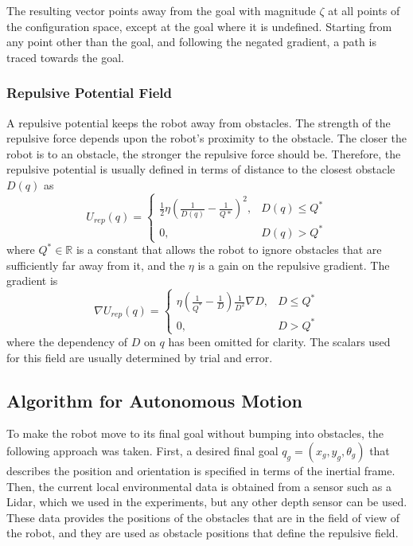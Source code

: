 \documentclass[conference]{IEEEtran}
\begin{document}
The resulting vector points away from the goal with magnitude $\zeta$ at all
points of the configuration space, except at the goal where it is
undefined. Starting from any point other than the goal, and following the
negated gradient, a path is traced towards the goal.

\subsubsection{Repulsive Potential Field}

A repulsive potential keeps the robot away from obstacles. The strength of the
repulsive force depends upon the robot's proximity to the obstacle. The closer
the robot is to an obstacle, the stronger the repulsive force should
be. Therefore, the repulsive potential is usually defined in terms of distance
to the closest obstacle $D(q)$ as 
\begin{equation}
  U_{rep}(q) = 
  \begin{cases}
    \frac{1}{2}\eta(\frac{1}{D(q)} - \frac{1}{Q*})^2, & D(q)\leq Q^* \\
    0, & D(q) > Q^*
  \end{cases}
  \label{eq:pot_rep}
\end{equation}
where $Q^* \in \mathbb R$ is a constant that allows the robot to ignore
obstacles that are sufficiently far away from it, and the $\eta$ is a gain on
the repulsive gradient. The gradient is
\begin{equation}
  \nabla U_{rep}(q) = 
  \begin{cases}
    \eta (\frac{1}{Q^*} - \frac{1}{D})\frac{1}{D^2} \nabla D, &D \leq Q^*\\
    0 , &D > Q^*
  \end{cases}
  \label{eq:force_rep}
\end{equation}
where the dependency of $D$ on $q$ has been omitted for clarity. The scalars
used for this field are usually determined by trial and error.

\subsection{Algorithm for Autonomous Motion}
\label{sec:algor}
To make the robot move to its final goal without bumping into obstacles, the
following approach was taken. First, a desired final goal
$q_g=(x_g, y_g, \theta_g)$ that describes the position and orientation is
specified in terms of the inertial frame. Then, the current local environmental
data is obtained from a sensor such as a Lidar, which we used in the
experiments, but any other depth sensor can be used. These data provides the
positions of the obstacles that are in the field of view of the robot, and they
are used as obstacle positions that define the repulsive field.
\end{document}
